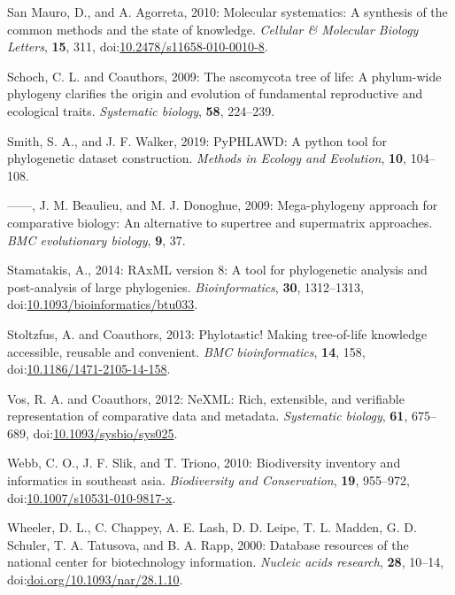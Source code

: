 \documentclass[draft]{ametsoc}
\begin{document}
\leavevmode\hypertarget{ref-san2010molecular}{}%
San Mauro, D., and A. Agorreta, 2010: Molecular systematics: A synthesis
of the common methods and the state of knowledge. \emph{Cellular \&
Molecular Biology Letters}, \textbf{15}, 311,
doi:\href{https://doi.org/10.2478/s11658-010-0010-8}{10.2478/s11658-010-0010-8}.

\leavevmode\hypertarget{ref-schoch2009ascomycota}{}%
Schoch, C. L. and Coauthors, 2009: The ascomycota tree of life: A
phylum-wide phylogeny clarifies the origin and evolution of fundamental
reproductive and ecological traits. \emph{Systematic biology},
\textbf{58}, 224--239.

\leavevmode\hypertarget{ref-smith2019pyphlawd}{}%
Smith, S. A., and J. F. Walker, 2019: PyPHLAWD: A python tool for
phylogenetic dataset construction. \emph{Methods in Ecology and
Evolution}, \textbf{10}, 104--108.

\leavevmode\hypertarget{ref-smith2009mega}{}%
------, J. M. Beaulieu, and M. J. Donoghue, 2009: Mega-phylogeny
approach for comparative biology: An alternative to supertree and
supermatrix approaches. \emph{BMC evolutionary biology}, \textbf{9}, 37.

\leavevmode\hypertarget{ref-stamatakis2014raxml}{}%
Stamatakis, A., 2014: RAxML version 8: A tool for phylogenetic analysis
and post-analysis of large phylogenies. \emph{Bioinformatics},
\textbf{30}, 1312--1313,
doi:\href{https://doi.org/10.1093/bioinformatics/btu033}{10.1093/bioinformatics/btu033}.

\leavevmode\hypertarget{ref-stoltzfus2013phylotastic}{}%
Stoltzfus, A. and Coauthors, 2013: Phylotastic! Making tree-of-life
knowledge accessible, reusable and convenient. \emph{BMC
bioinformatics}, \textbf{14}, 158,
doi:\href{https://doi.org/10.1186/1471-2105-14-158}{10.1186/1471-2105-14-158}.

\leavevmode\hypertarget{ref-vos2012nexml}{}%
Vos, R. A. and Coauthors, 2012: NeXML: Rich, extensible, and verifiable
representation of comparative data and metadata. \emph{Systematic
biology}, \textbf{61}, 675--689,
doi:\href{https://doi.org/10.1093/sysbio/sys025}{10.1093/sysbio/sys025}.

\leavevmode\hypertarget{ref-webb2010biodiversity}{}%
Webb, C. O., J. F. Slik, and T. Triono, 2010: Biodiversity inventory and
informatics in southeast asia. \emph{Biodiversity and Conservation},
\textbf{19}, 955--972,
doi:\href{https://doi.org/10.1007/s10531-010-9817-x}{10.1007/s10531-010-9817-x}.

\leavevmode\hypertarget{ref-wheeler2000database}{}%
Wheeler, D. L., C. Chappey, A. E. Lash, D. D. Leipe, T. L. Madden, G. D.
Schuler, T. A. Tatusova, and B. A. Rapp, 2000: Database resources of the
national center for biotechnology information. \emph{Nucleic acids
research}, \textbf{28}, 10--14,
doi:\href{https://doi.org/doi.org/10.1093/nar/28.1.10}{doi.org/10.1093/nar/28.1.10}.
\end{document}
